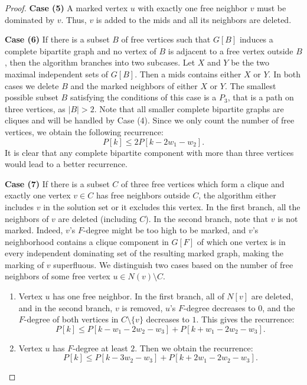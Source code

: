 \documentclass[a4paper,10pt]{article}
\theoremstyle{plain}
\theoremstyle{definition}
\theoremstyle{remark}
\newcommand{\ids}{independent dominating set\xspace}
\newcommand{\mids}{mids\xspace}
\begin{document}
\begin{proof}
{\bf Case (5)}
A marked vertex $u$ with exactly one free neighbor $v$ must be dominated by $v$. Thus, $v$ is added to the \mids and all
its neighbors are deleted.

{\bf Case (6)}
If there is a subset $B$ of free vertices such that $G[B]$ induces a complete bipartite
graph and no vertex of $B$ is adjacent to a free vertex outside $B$, then the algorithm branches
into two subcases. Let $X$ and $Y$ be the two maximal independent sets of $G[B]$. Then
a \mids contains either $X$ or $Y$. In both cases we delete $B$
and the marked neighbors of either $X$ or $Y$.
The smallest possible subset $B$ satisfying the conditions of this case
is a $P_3$, that is a path on three vertices,
as $|B|>2$. Note that all smaller complete bipartite graphs are cliques and will be handled by Case (4).
Since we only count the number of free vertices, we obtain the following recurrence:
\begin{equation}
P[k] \leq 2P[k-2w_1-w_2].
\end{equation}
It is clear that any complete bipartite component with more than three
vertices would lead to a better recurrence.

{\bf Case (7)}
If there is a subset $C$ of three free vertices which form a clique and exactly one vertex $v \in C$
has free neighbors outside $C$, the algorithm either includes $v$ in the solution set or it
excludes this vertex. In the first branch, all the neighbors of $v$ are deleted
(including $C$). In the second branch, note that $v$ is not marked. Indeed, $v$'s $F$-degree
might be too high to be marked, and $v$'s neighborhood contains a clique component in $G[F]$ of which one vertex is in every
\ids of the resulting marked graph, making the marking of $v$ superfluous.
We distinguish two cases based on the number of free neighbors of some free vertex $u \in N(v) \setminus C$.
\begin{enumerate}
\item Vertex $u$ has one free neighbor. In the first branch, all of $N[v]$ are deleted, and in the second branch, $v$ is removed,
$u$'s $F$-degree decreases to $0$, and the $F$-degree of both vertices in $C \setminus \{v\}$ decreases to $1$.
This gives the recurrence:
\begin{equation}
P[k] \leq P[k-w_1-2w_2-w_3]+P[k+w_1-2w_2-w_3].
\end{equation}
\item Vertex $u$ has $F$-degree at least $2$. Then we obtain the recurrence:
\begin{equation}
P[k] \leq P[k-3w_2-w_3]+P[k+2w_1-2w_2-w_3].
\end{equation}
\end{enumerate}


\end{proof}
\end{document}
